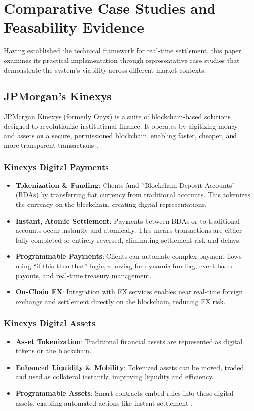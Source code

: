 \documentclass[conference]{IEEEtran}
\begin{document}
\section{Comparative Case Studies and Feasability Evidence}
Having established the technical framework for real-time settlement, this paper examines its practical implementation through representative case studies that demonstrate the system's viability across different market contexts.
\subsection{JPMorgan's Kinexys}
JPMorgan Kinexys (formerly Onyx) is a suite of blockchain-based solutions designed to revolutionize institutional finance. It operates by digitizing money and assets on a secure, permissioned blockchain, enabling faster, cheaper, and more transparent transactions\cite{b5} \cite{b6}.
\subsubsection{Kinexys Digital Payments}
\begin{itemize}
    \item \textbf{Tokenization \& Funding}: Clients fund ``Blockchain Deposit Accounts'' (BDAs) by transferring fiat currency from traditional accounts. This tokenizes the currency on the blockchain, creating digital representations.
    
    \item \textbf{Instant, Atomic Settlement}: Payments between BDAs or to traditional accounts occur instantly and atomically. This means transactions are either fully completed or entirely reversed, eliminating settlement risk and delays.
    
    \item \textbf{Programmable Payments}: Clients can automate complex payment flows using ``if-this-then-that'' logic, allowing for dynamic funding, event-based payouts, and real-time treasury management.
    
    \item \textbf{On-Chain FX}: Integration with FX services enables near real-time foreign exchange and settlement directly on the blockchain, reducing FX risk.
\end{itemize}
\subsubsection{Kinexys Digital Assets}
\begin{itemize}
    \item \textbf{Asset Tokenization}: Traditional financial assets are represented as digital tokens on the blockchain.
    
    \item \textbf{Enhanced Liquidity \& Mobility}: Tokenized assets can be moved, traded, and used as collateral instantly, improving liquidity and efficiency.
    
    \item \textbf{Programmable Assets}: Smart contracts embed rules into these digital assets, enabling automated actions like instant settlement .
\end{itemize}
\end{document}
